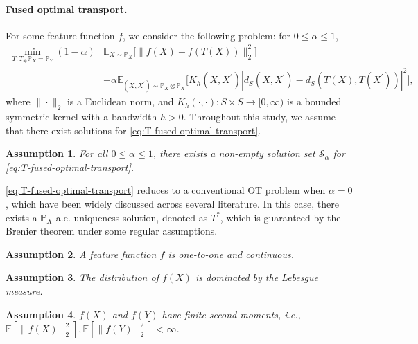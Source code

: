 \documentclass{article}
\newtheorem{assumption}{Assumption}
\begin{document}
\paragraph{Fused optimal transport.} For some feature function $f$, we consider the following problem: for $0 \leq \alpha \leq 1$,
\begin{align}
	\label{eq:T-fused-optimal-transport}
	\min_{T: T_{\#}\mathbb{P}_X = \mathbb{P}_Y} (1-\alpha)&\mathbb{E}_{X \sim \mathbb{P}_X} \Big[ \| f(X) - f(T(X)) \|_2^2 \Big] \nonumber\\
	&+ \alpha \mathbb{E}_{(X,X^\prime) \sim \mathbb{P}_X \otimes \mathbb{P}_X}\Big[K_h(X,X^\prime)\left\vert d_S(X,X^\prime) - d_S(T(X),T(X^\prime)) \right\vert^2\Big] ,
\end{align}
where $\|\cdot\|_2$ is a Euclidean norm, and $K_h(\cdot,\cdot): S \times S \to [0,\infty)$ is a bounded symmetric kernel with a bandwidth $h > 0$. Throughout this study, we assume that there exist solutions for \eqref{eq:T-fused-optimal-transport}.
\begin{assumption}
	\label{ass:existence}
	For all $0 \leq \alpha \leq 1$, there exists a non-empty solution set $\mathcal{S}_\alpha$ for \eqref{eq:T-fused-optimal-transport}.
\end{assumption}

\eqref{eq:T-fused-optimal-transport} reduces to a conventional OT problem when $\alpha = 0$, which have been widely discussed across several literature. In this case, there exists a $\mathbb{P}_X$-a.e. uniqueness solution, denoted as $T^\ast$, which is guaranteed by the Brenier theorem under some regular assumptions.

\begin{assumption}
	\label{ass:feature-function}
	A feature function $f$ is one-to-one and continuous.
\end{assumption}

\begin{assumption}
	\label{ass:absolute-continuity}
	The distribution of $f(X)$ is dominated by the Lebesgue measure.
\end{assumption}

\begin{assumption}
	\label{ass:finite-second-moment}
	$f(X)$ and $f(Y)$ have finite second moments, i.e., $\mathbb{E}[\|f(X)\|_2^2], \mathbb{E}[\|f(Y)\|_2^2] < \infty$.
\end{assumption}
\end{document}
